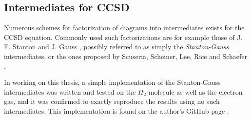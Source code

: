 \subsection{Intermediates for CCSD}

Numerous schemes for factorization of diagrams into intermediates
exists for the CCSD equation.  Commonly used such factorizations are
for example those of J. F. Stanton and J. Gauss \cite{Solomonik2013},
possibly referred to as simply the \emph{Stanton-Gauss} intermediates,
or the ones proposed by Scuseria, Scheiner, Lee, Rice and Schaefer
\cite{scuseria1987}.

In working on this thesis, a simple implementation of the
Stanton-Gauss intermediates was written and tested on the $H_2$
molecule as well as the electron gas, and it was confirmed to exactly
reproduce the results using no such intermediates. This implementation
is found on the author's GitHub page \cite{fermicc}.



